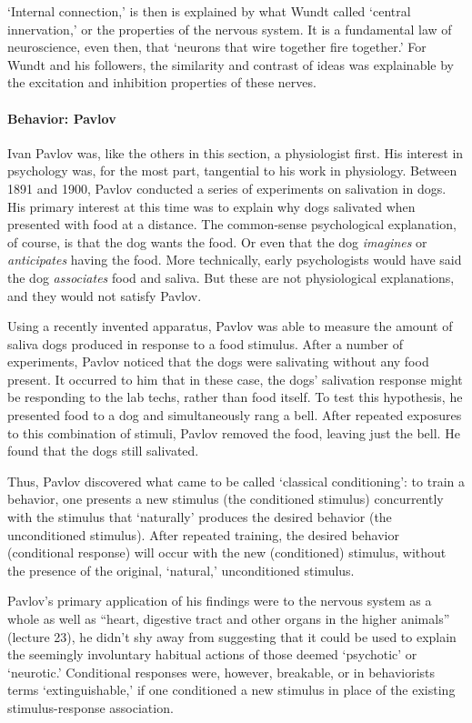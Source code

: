 `Internal connection,' is then is explained by what Wundt called `central innervation,' or the properties of the nervous system. It is a fundamental law of neuroscience, even then, that `neurons that wire together fire together.' For Wundt and his followers, the similarity and contrast of ideas was explainable by the excitation and inhibition properties of these nerves.

\paragraph{Behavior: Pavlov}
\label{behavior:pavlov}

Ivan Pavlov was, like the others in this section, a physiologist first. His interest in psychology was, for the most part, tangential to his work in physiology. Between 1891 and 1900, Pavlov conducted a series of experiments on salivation in dogs. His primary interest at this time was to explain why dogs salivated when presented with food at a distance. The common-sense psychological explanation, of course, is that the dog wants the food. Or even that the dog \emph{imagines} or \emph{anticipates} having the food. More technically, early psychologists would have said the dog \emph{associates} food and saliva. But these are not physiological explanations, and they would not satisfy Pavlov.

Using a recently invented apparatus, Pavlov was able to measure the amount of saliva dogs produced in response to a food stimulus. After a number of experiments, Pavlov noticed that the dogs were salivating without any food present. It occurred to him that in these case, the dogs' salivation response might be responding to the lab techs, rather than food itself. To test this hypothesis, he presented food to a dog and simultaneously rang a bell. After repeated exposures to this combination of stimuli, Pavlov removed the food, leaving just the bell. He found that the dogs still salivated.

Thus, Pavlov discovered what came to be called `classical conditioning': to train a behavior, one presents a new stimulus (the conditioned stimulus) concurrently with the stimulus that `naturally' produces the desired behavior (the unconditioned stimulus). After repeated training, the desired behavior (conditional response) will occur with the new (conditioned) stimulus, without the presence of the original, `natural,' unconditioned stimulus.

Pavlov's primary application of his findings were to the nervous system as a whole as well as “heart, digestive tract and other organs in the higher animals” (lecture 23), he didn't shy away from suggesting that it could be used to explain the seemingly involuntary habitual actions of those deemed `psychotic' or `neurotic.' Conditional responses were, however, breakable, or in behaviorists terms `extinguishable,' if one conditioned a new stimulus in place of the existing stimulus-response association.

